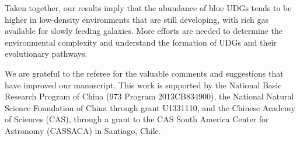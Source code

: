 \documentclass[twocolumn,trackchanges]{aastex61}
\begin{document}
Taken together, our results imply that the abundance of blue UDGs tends to be higher in low-density environments that are still developing, with rich gas available for slowly feeding galaxies. More efforts are needed to determine the environmental complexity and understand the formation of UDGs and their evolutionary pathways. 


\acknowledgments

We are grateful to the referee for the valuable comments and suggestions that have improved our manuscript. 
This work is supported by the National Basic Research Program of China (973 Program 2013CB834900), the National Natural Science Foundation of China through grant U1331110, and the Chinese Academy of Sciences (CAS), through a grant to the CAS South America Center for Astronomy (CASSACA) in Santiago, Chile.
\end{document}

